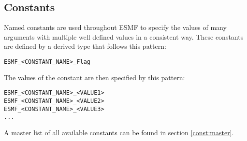 \subsection{Constants}

Named constants are used throughout ESMF to specify the values of many 
arguments with multiple well defined values in a consistent way.  These 
constants are defined by a derived type that follows this pattern:

\begin{verbatim}
ESMF_<CONSTANT_NAME>_Flag
\end{verbatim}

The values of the constant are then specified by this pattern:

\begin{verbatim}
ESMF_<CONSTANT_NAME>_<VALUE1>
ESMF_<CONSTANT_NAME>_<VALUE2>
ESMF_<CONSTANT_NAME>_<VALUE3>
...
\end{verbatim}

A master list of all available constants can be found in section 
\ref{const:master}.
